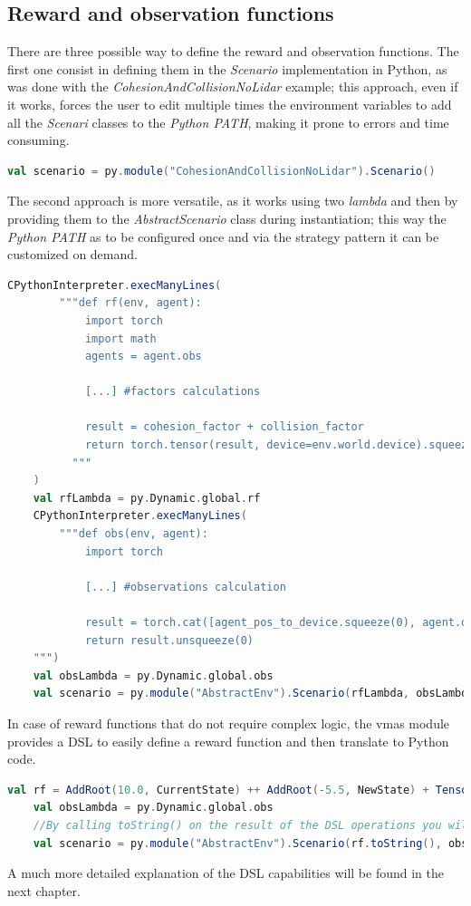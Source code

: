 \documentclass[12pt,a4paper,openright,twoside]{book}
\begin{document}
\subsection{Reward and observation functions}
There are three possible way to define the reward and observation functions. The first one consist in defining them in the \emph{Scenario} implementation in Python, as was done with the \emph{CohesionAndCollisionNoLidar} example; this approach, even if it works, forces the user to edit multiple times the environment variables to add all the \emph{Scenari} classes to the \emph{Python PATH}, making it prone to errors and time consuming.\\
\begin{lstlisting}[language=scala]
    val scenario = py.module("CohesionAndCollisionNoLidar").Scenario()
\end{lstlisting}
The second approach is more versatile, as it works using two \emph{lambda} and then by providing them to the \emph{AbstractScenario} class during instantiation; this way the \emph{Python PATH} as to be configured once and via the strategy pattern it can be customized on demand.
\begin{lstlisting}[language=scala]
    CPythonInterpreter.execManyLines(
        """def rf(env, agent):
            import torch
            import math
            agents = agent.obs
            
            [...] #factors calculations

            result = cohesion_factor + collision_factor
            return torch.tensor(result, device=env.world.device).squeeze(0)
          """
    )
    val rfLambda = py.Dynamic.global.rf
    CPythonInterpreter.execManyLines(
        """def obs(env, agent):
            import torch
            
            [...] #observations calculation

            result = torch.cat([agent_pos_to_device.squeeze(0), agent.obs.view(10)], dim=-1)
            return result.unsqueeze(0)
    """)
    val obsLambda = py.Dynamic.global.obs
    val scenario = py.module("AbstractEnv").Scenario(rfLambda, obsLambda)
\end{lstlisting}

In case of reward functions that do not require complex logic, the vmas module provides a DSL to easily define a reward function and then translate to Python code.
\begin{lstlisting}[language=scala]
    val rf = AddRoot(10.0, CurrentState) ++ AddRoot(-5.5, NewState) + Tensor(5) --> Lambda("x: x") >> Lambda("x: x.min()")
    val obsLambda = py.Dynamic.global.obs
    //By calling toString() on the result of the DSL operations you will get the equivalent Python code to be provided as a lambda to the scenario
    val scenario = py.module("AbstractEnv").Scenario(rf.toString(), obsLambda)
\end{lstlisting}
A much more detailed explanation of the DSL capabilities will be found in the next chapter.
\end{document}
